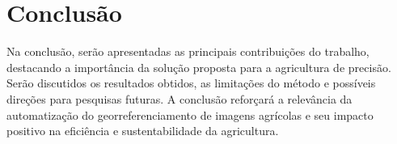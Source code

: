 \documentclass[conference]{IEEEtran}
\begin{document}
\section{Conclusão}
Na conclusão, serão apresentadas as principais contribuições do trabalho, destacando a 
importância da solução proposta para a agricultura de precisão. Serão discutidos os resultados 
obtidos, as limitações do método e possíveis direções para pesquisas futuras.
A conclusão reforçará a relevância da automatização do georreferenciamento de imagens 
agrícolas e seu impacto positivo na eficiência e sustentabilidade da agricultura.







\end{document}
